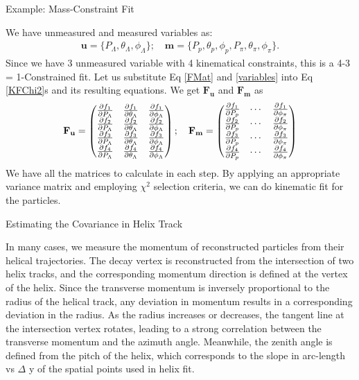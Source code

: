 \documentclass[
	xcolor=dvipsnames,
	10pt, 
	]{beamer}
\begin{document}
\begin{frame}{Example: Mass-Constraint Fit}
	\begin{block}{}
		We have unmeasured and measured variables as:
		\begin{align}
			\mathbf{u} = \{P_\Lambda,\theta_\Lambda,\phi_\Lambda\};\quad \mathbf{m}=\{P_p,\theta_p,\phi_p,P_\pi,\theta_\pi,\phi_\pi\}.\label{variables}
		\end{align}		
		Since we have 3 unmeasured variable with 4 kinematical constraints, this is a 4-3 = 1-Constrained fit. Let us substitute Eq \eqref{FMat} and \eqref{variables} into Eq \eqref{KFChi2}s and its resulting equations. We get $\mathbf{F_u}$ and $\mathbf{F_m}$ as
		\begin{align}
			\mathbf{F_u}=
			\begin{pmatrix}
				\frac{\partial f_1}{\partial P_\Lambda}&\frac{\partial f_1}{\partial \theta_\Lambda}&\frac{\partial f_1}{\partial \phi_\Lambda}\\
				\frac{\partial f_2}{\partial P_\Lambda}&\frac{\partial f_2}{\partial \theta_\Lambda}&\frac{\partial f_2}{\partial \phi_\Lambda}\\
				\frac{\partial f_3}{\partial P_\Lambda}&\frac{\partial f_3}{\partial \theta_\Lambda}&\frac{\partial f_3}{\partial \phi_\Lambda}\\
				\frac{\partial f_4}{\partial P_\Lambda}&\frac{\partial f_4}{\partial \theta_\Lambda}&\frac{\partial f_4}{\partial \phi_\Lambda}
			\end{pmatrix};\quad \mathbf{F_m}=\begin{pmatrix}
			\frac{\partial f_1}{\partial P_p} &\cdots&\frac{\partial f_1}{\partial \phi_\pi} \\
			\frac{\partial f_2}{\partial P_p} &\cdots&\frac{\partial f_2}{\partial \phi_\pi}\\
			\frac{\partial f_3}{\partial P_p} &\cdots&\frac{\partial f_3}{\partial \phi_\pi}\\
			\frac{\partial f_4}{\partial P_p} &\cdots&\frac{\partial f_4}{\partial \phi_\pi}
			\end{pmatrix}
		\end{align}
		We have all the matrices to calculate in each step. By applying an appropriate variance matrix and employing $\chi^2$ selection criteria, we can do kinematic fit for the particles.
	\end{block}
\end{frame}
\iffalse
\begin{frame}{Estimating the Covariance in Helix Track}
	\begin{block}{}
		In many cases, we measure the momentum of reconstructed particles from their helical trajectories. The decay vertex is reconstructed from the intersection of two helix tracks, and the corresponding momentum direction is defined at the vertex of the helix. Since the transverse momentum is inversely proportional to the radius of the helical track, any deviation in momentum results in a corresponding deviation in the radius. As the radius increases or decreases, the tangent line at the intersection vertex rotates, leading to a strong correlation between the transverse momentum and the azimuth angle. Meanwhile, the zenith angle is defined from the pitch of the helix, which corresponds to the slope in arc-length vs $\Delta$ y of the spatial points used in helix fit.
	\end{block}
\end{frame}
\end{document}
